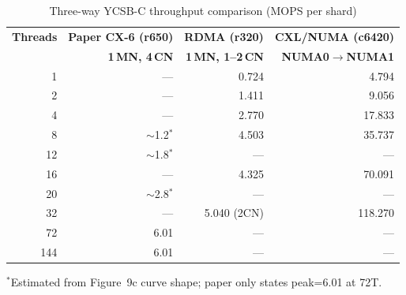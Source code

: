 \documentclass[conference]{IEEEtran}
\begin{document}
\begin{table}[H]
\centering
\caption{Three-way YCSB-C throughput comparison (MOPS per shard)}
\label{tab:three-way}
\small
\begin{tabular}{@{}rrrr@{}}
\toprule
\textbf{Threads} & \textbf{Paper CX-6 (r650)} & \textbf{RDMA (r320)} & \textbf{CXL/NUMA (c6420)} \\
 & \textbf{1\,MN, 4\,CN} & \textbf{1\,MN, 1--2\,CN} & \textbf{NUMA0$\to$NUMA1} \\
\midrule
1  &  --- & 0.724 & 4.794 \\
2  &  --- & 1.411 & 9.056 \\
4  &  --- & 2.770 & 17.833 \\
8  & $\sim$1.2$^*$ & 4.503 & 35.737 \\
12 & $\sim$1.8$^*$ & --- & --- \\
16 & --- & 4.325 & 70.091 \\
20 & $\sim$2.8$^*$ & --- & --- \\
32 & --- & 5.040 (2CN) & 118.270 \\
72 & 6.01 & --- & --- \\
144 & 6.01 & --- & --- \\
\bottomrule
\end{tabular}

\vspace{2pt}
{\scriptsize $^*$Estimated from Figure~9c curve shape; paper only states peak=6.01 at 72T.}
\end{table}
\end{document}
